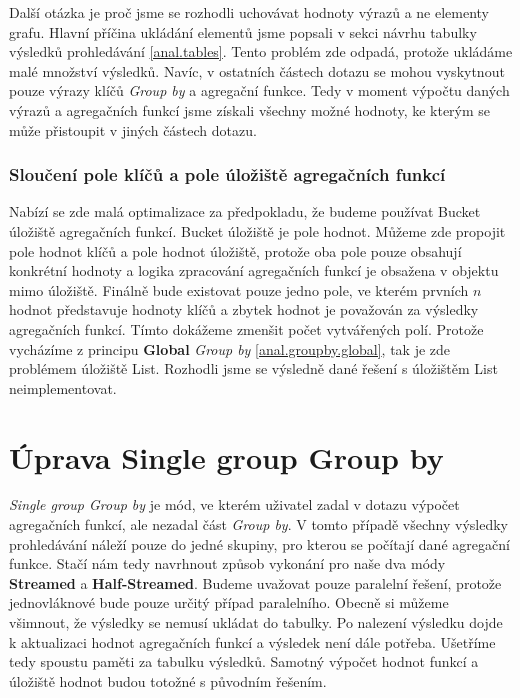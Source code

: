 Další otázka je proč jsme se rozhodli uchovávat hodnoty výrazů a ne elementy grafu.
Hlavní příčina ukládání elementů jsme popsali v sekci návrhu tabulky výsledků prohledávání \ref{anal.tables}.
Tento problém zde odpadá, protože ukládáme malé množství výsledků.
Navíc, v ostatních částech dotazu se mohou vyskytnout pouze výrazy klíčů \textit{Group by} a agregační funkce.
Tedy v moment výpočtu daných výrazů a agregačních funkcí jsme získali všechny možné hodnoty, ke kterým se může přistoupit v jiných částech dotazu. 

\subsubsection{Sloučení pole klíčů a pole úložiště agregačních funkcí}

Nabízí se zde malá optimalizace za předpokladu, že budeme používat Bucket úložiště agregačních funkcí.
Bucket úložiště je pole hodnot.
Můžeme zde propojit pole hodnot klíčů a pole hodnot úložiště, protože oba pole pouze obsahují konkrétní hodnoty a logika zpracování agregačních funkcí je obsažena v objektu mimo úložiště.
Finálně bude existovat pouze jedno pole, ve kterém prvních $n$ hodnot představuje hodnoty klíčů a zbytek hodnot je považován za výsledky agregačních funkcí.
Tímto dokážeme zmenšit počet vytvářených polí.
Protože vycházíme z principu \textbf{Global} \textit{Group by} \ref{anal.groupby.global}, tak je zde problémem úložiště List.
Rozhodli jsme se výsledně dané řešení s úložištěm List neimplementovat.


\section{Úprava Single group Group by} \label{anal.improvement.singlegroup}

\textit{Single group Group by} je mód, ve kterém uživatel zadal v dotazu výpočet agregačních funkcí, ale nezadal část \textit{Group by}.
V tomto případě všechny výsledky prohledávání náleží pouze do jedné skupiny, pro kterou se počítají dané agregační funkce.
Stačí nám tedy navrhnout způsob vykonání pro naše dva módy \textbf{Streamed} a \textbf{Half-Streamed}.
Budeme uvažovat pouze paralelní řešení, protože jednovláknové bude pouze určitý případ paralelního.
Obecně si můžeme všimnout, že výsledky se nemusí ukládat do tabulky.
Po nalezení výsledku dojde k aktualizaci hodnot agregačních funkcí a výsledek není dále potřeba.
Ušetříme tedy spoustu paměti za tabulku výsledků.
Samotný výpočet hodnot funkcí a úložiště hodnot budou totožné s původním řešením.

